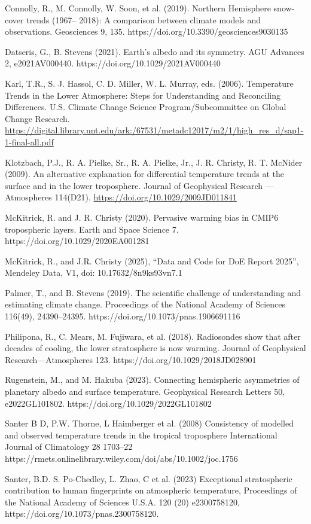 \documentclass[12pt,paper=a4,DIV=12,parskip=never,chapterprefix=false,headings=standardclasses]{scrreprt}
\begin{document}
Connolly, R., M. Connolly, W. Soon, et al. (2019). Northern Hemisphere snow-cover trends (1967–
2018): A comparison between climate models and observations. Geosciences 9, 135.
https://doi.org/10.3390/geosciences9030135

Datseris, G., B. Stevens (2021). Earth’s albedo and its symmetry. AGU Advances 2,
e2021AV000440. https://doi.org/10.1029/2021AV000440

Karl, T.R., S. J. Hassol, C. D. Miller, W. L. Murray, eds. (2006). Temperature Trends in the Lower
Atmosphere: Steps for Understanding and Reconciling Differences. U.S. Climate Change Science
Program/Subcommittee on Global Change Research.
\url{https://digital.library.unt.edu/ark:/67531/metadc12017/m2/1/high_res_d/sap1-1-final-all.pdf}

Klotzbach, P.J., R. A. Pielke, Sr., R. A. Pielke, Jr., J. R. Christy, R. T. McNider (2009). An alternative
explanation for differential temperature trends at the surface and in the lower troposphere.
Journal of Geophysical Research — Atmospheres 114(D21).
\url{https://doi.org/10.1029/2009JD011841}

McKitrick, R. and J. R. Christy (2020). Pervasive warming bias in CMIP6 tropospheric layers. Earth and
Space Science 7. https://doi.org/10.1029/2020EA001281

McKitrick, R., and J.R. Christy (2025), “Data and Code for DoE Report 2025”, Mendeley Data, V1, doi:
10.17632/8n9ks93vn7.1

Palmer, T., and B. Stevens (2019). The scientific challenge of understanding and estimating climate
change. Proceedings of the National Academy of Sciences 116(49), 24390–24395.
https://doi.org/10.1073/pnas.1906691116

Philipona, R., C. Mears, M. Fujiwara, et al. (2018). Radiosondes show that after decades of cooling, the
lower stratosphere is now warming. Journal of Geophysical Research—Atmospheres 123.
https://doi.org/10.1029/2018JD028901

Rugenstein, M., and M. Hakuba (2023). Connecting hemispheric asymmetries of planetary albedo and
surface temperature. Geophysical Research Letters 50, e2022GL101802.
https://doi.org/10.1029/2022GL101802

Santer B D, P.W. Thorne, L Haimberger et al. (2008) Consistency of modelled and observed temperature
trends in the tropical troposphere International Journal of Climatology 28 1703–22
https://rmets.onlinelibrary.wiley.com/doi/abs/10.1002/joc.1756


Santer, B.D. S. Po-Chedley, L. Zhao, C et al. (2023) Exceptional stratospheric contribution to human
fingerprints on atmospheric temperature, Proceedings of the National Academy of Sciences U.S.A. 120
(20) e2300758120, https://doi.org/10.1073/pnas.2300758120.
\end{document}
